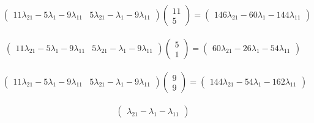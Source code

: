 \documentclass[12pt]{report}
\begin{document}
\begin{equation}
	\begin{aligned}
		\begin{pmatrix}11\lambda_{21}-5\lambda_{1}-9\lambda_{11} & 5\lambda_{21}-\lambda_{1}-9\lambda_{11}\end{pmatrix}\begin{pmatrix}11 \\ 5\end{pmatrix}=\begin{pmatrix}146\lambda_{21}-60\lambda_{1}-144\lambda_{11}\end{pmatrix}
	\end{aligned}
\end{equation}

\begin{equation}
	\begin{aligned}
		\begin{pmatrix}11\lambda_{21}-5\lambda_{1}-9\lambda_{11} & 5\lambda_{21}-\lambda_{1}-9\lambda_{11}\end{pmatrix}\begin{pmatrix}5 \\ 1\end{pmatrix}=\begin{pmatrix}60\lambda_{21}-26\lambda_{1}-54\lambda_{11}\end{pmatrix}
	\end{aligned}
\end{equation}

\begin{equation}
	\begin{aligned}
		\begin{pmatrix}11\lambda_{21}-5\lambda_{1}-9\lambda_{11} & 5\lambda_{21}-\lambda_{1}-9\lambda_{11}\end{pmatrix}\begin{pmatrix}9 \\ 9\end{pmatrix}=\begin{pmatrix}144\lambda_{21}-54\lambda_{1}-162\lambda_{11}\end{pmatrix}
	\end{aligned}
\end{equation}

\begin{equation}
	\begin{aligned}
		\begin{pmatrix}\lambda_{21}-\lambda_{1}-\lambda_{11}\end{pmatrix}
	\end{aligned}
\end{equation}
\end{document}
